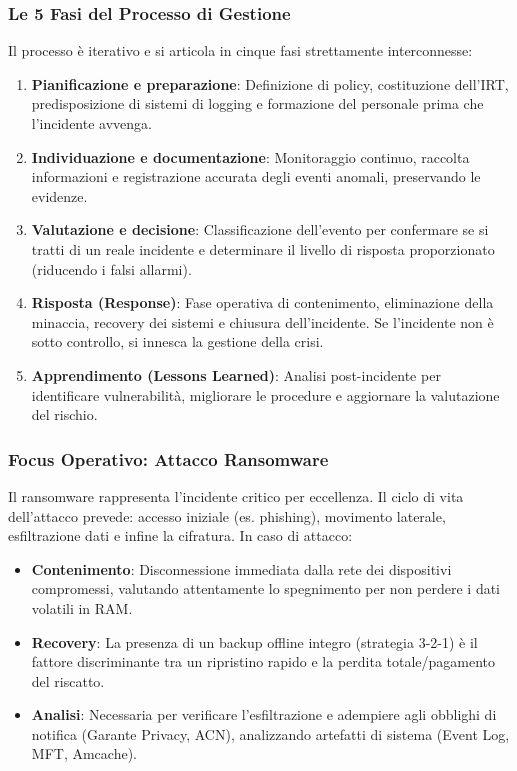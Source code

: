 \documentclass[11pt,a4paper]{article}
\begin{document}
\subsubsection{Le 5 Fasi del Processo di Gestione}
Il processo è iterativo e si articola in cinque fasi strettamente interconnesse:
\begin{enumerate}
    \item \textbf{Pianificazione e preparazione}: Definizione di policy, costituzione dell'IRT, predisposizione di sistemi di logging e formazione del personale prima che l'incidente avvenga.
    \item \textbf{Individuazione e documentazione}: Monitoraggio continuo, raccolta informazioni e registrazione accurata degli eventi anomali, preservando le evidenze.
    \item \textbf{Valutazione e decisione}: Classificazione dell'evento per confermare se si tratti di un reale incidente e determinare il livello di risposta proporzionato (riducendo i falsi allarmi).
    \item \textbf{Risposta (Response)}: Fase operativa di contenimento, eliminazione della minaccia, recovery dei sistemi e chiusura dell'incidente. Se l'incidente non è sotto controllo, si innesca la gestione della crisi.
    \item \textbf{Apprendimento (Lessons Learned)}: Analisi post-incidente per identificare vulnerabilità, migliorare le procedure e aggiornare la valutazione del rischio.
\end{enumerate}

\subsubsection{Focus Operativo: Attacco Ransomware}
Il ransomware rappresenta l'incidente critico per eccellenza. Il ciclo di vita dell'attacco prevede: accesso iniziale (es. phishing), movimento laterale, esfiltrazione dati e infine la cifratura.
In caso di attacco:
\begin{itemize}
    \item \textbf{Contenimento}: Disconnessione immediata dalla rete dei dispositivi compromessi, valutando attentamente lo spegnimento per non perdere i dati volatili in RAM.
    \item \textbf{Recovery}: La presenza di un backup offline integro (strategia 3-2-1) è il fattore discriminante tra un ripristino rapido e la perdita totale/pagamento del riscatto.
    \item \textbf{Analisi}: Necessaria per verificare l'esfiltrazione e adempiere agli obblighi di notifica (Garante Privacy, ACN), analizzando artefatti di sistema (Event Log, MFT, Amcache).
\end{itemize}
\end{document}
